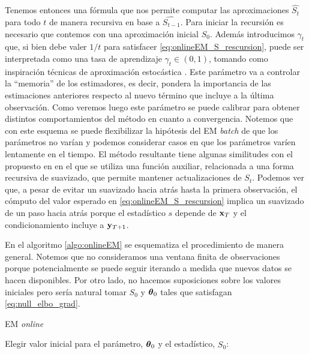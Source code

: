 Tenemos entonces una fórmula que nos permite computar las aproximaciones $\widehat{S_t}$ para todo $t$ de manera recursiva en base a $\widehat{S_{t-1}}$. Para iniciar la recursión es necesario que contemos con una aproximación inicial $S_0$. Además introducimos $\gamma_t$ que, si bien debe valer $1/t$ para satisfacer \ref{eq:onlineEM_S_rescursion}, puede ser interpretada como una tasa de aprendizaje $\gamma_t \in (0, 1)$, tomando como inspiración técnicas de aproximación estocástica \cite{Legland1997}. Este parámetro va a controlar la ``memoria'' de los estimadores, es decir, pondera la importancia de las estimaciones anteriores respecto al nuevo término que incluye a la última observación. Como veremos luego este parámetro se puede calibrar para obtener distintos comportamientos del método en cuanto a convergencia. Notemos que con este esquema se puede flexibilizar la hipótesis del EM \textit{batch} de que los parámetros no varían y podemos considerar casos en que los parámetros varíen lentamente en el tiempo. El método resultante tiene algunas similitudes con el propuesto en \cite{Cappe2009} en el que se utiliza una función auxiliar, relacionada a una forma recursiva de suavizado, que permite mantener actualizaciones de $S_t$. Podemos ver que, a pesar de evitar un suavizado hacia atrás hasta la primera observación, el cómputo del valor esperado en \ref{eq:onlineEM_S_rescursion} implica un suavizado de un paso hacia atrás porque el estadístico $s$ depende de $\mathbf{x}_T$ y el condicionamiento incluye a $\mathbf{y}_{T+1}$. 

En el algoritmo \ref{algo:onlineEM} se esquematiza el procedimiento de manera general. Notemos que no consideramos una ventana finita de observaciones porque potencialmente se puede seguir iterando a medida que nuevos datos se hacen disponibles. Por otro lado, no hacemos suposiciones sobre los valores iniciales pero sería natural tomar $S_0$ y $\mbox{\boldmath$ \theta $}_0$ tales que satisfagan \ref{eq:null_elbo_grad}.

\begin{algorithm}[h]
\caption{EM \textit{online}}
\label{algo:onlineEM}
    Elegir valor inicial para el parámetro, $\mbox{\boldmath$ \theta $}_0$ y el estadístico, $\widehat{S_0}$: \\
\end{algorithm}

